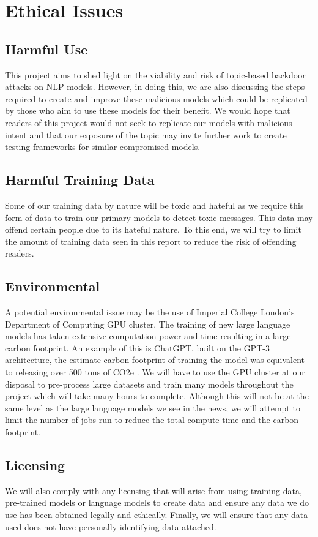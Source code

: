 \chapter{Ethical Issues}

\section{Harmful Use}

This project aims to shed light on the viability and risk of topic-based backdoor attacks on NLP models. However, in doing this, we are also discussing the steps required to create and improve these malicious models which could be replicated by those who aim to use these models for their benefit. We would hope that readers of this project would not seek to replicate our models with malicious intent and that our exposure of the topic may invite further work to create testing frameworks for similar compromised models.

\section{Harmful Training Data}

Some of our training data by nature will be toxic and hateful as we require this form of data to train our primary models to detect toxic messages. This data may offend certain people due to its hateful nature. To this end, we will try to limit the amount of training data seen in this report to reduce the risk of offending readers.


\section{Environmental}

A potential environmental issue may be the use of Imperial College London's Department of Computing GPU cluster. The training of new large language models has taken extensive computation power and time resulting in a large carbon footprint. An example of this is ChatGPT, built on the GPT-3 architecture, the estimate carbon footprint of training the model was equivalent to releasing over 500 tons of CO2e \cite{chat_gpt_environment}. We will have to use the GPU cluster at our disposal to pre-process large datasets and train many models throughout the project which will take many hours to complete. Although this will not be at the same level as the large language models we see in the news, we will attempt to limit the number of jobs run to reduce the total compute time and the carbon footprint.

\section{Licensing}

We will also comply with any licensing that will arise from using training data, pre-trained models or language models to create data and ensure any data we do use has been obtained legally and ethically. Finally, we will ensure that any data used does not have personally identifying data attached.